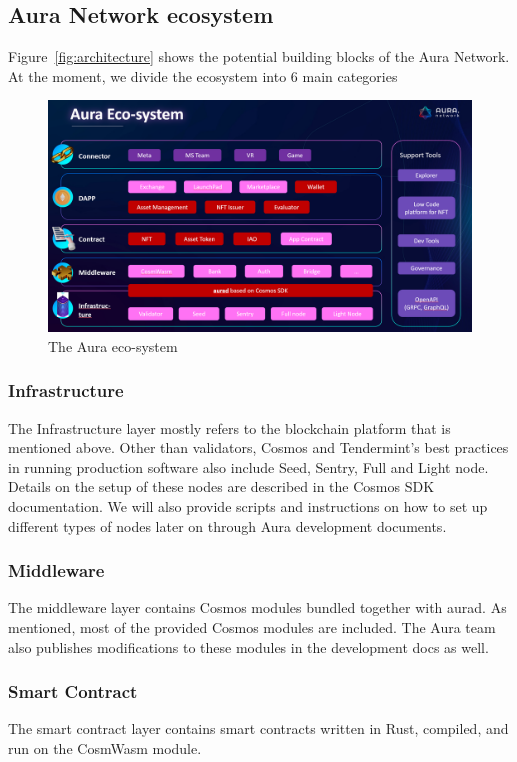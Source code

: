 \documentclass[12pt]{article}
\begin{document}
\subsection{Aura Network ecosystem}
Figure~\ref{fig:architecture} shows the potential building blocks of the Aura Network. At the moment, we divide the ecosystem into 6 main categories

\begin{figure}[ht]
\label{fig:auraeco}
\includegraphics[width=14cm]{img/auraeco.png}
\centering
\caption{The Aura eco-system}
\end{figure}

\subsubsection*{Infrastructure}
The Infrastructure layer mostly refers to the blockchain platform that is mentioned above. Other than validators, Cosmos and Tendermint's best practices in running production software also include Seed, Sentry, Full and Light node. Details on the setup of these nodes are described in the Cosmos SDK documentation. We will also provide scripts and instructions on how to set up different types of nodes later on through Aura development documents.

\subsubsection*{Middleware}
The middleware layer contains Cosmos modules bundled together with aurad. As mentioned, most of the provided Cosmos modules are included. The Aura team also publishes modifications to these modules in the development docs as well.

\subsubsection*{Smart Contract}
The smart contract layer contains smart contracts written in Rust, compiled, and run on the CosmWasm module.
\end{document}
